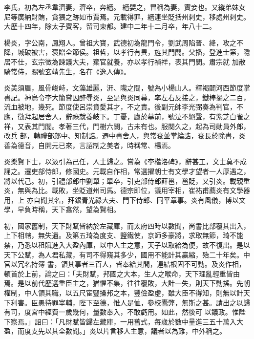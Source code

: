 \begin{pinyinscope}
 李氏，初為左丞韋濟妻，濟卒，奔縉。
 縉嬖之，冒稱為妻，實妾也。又縱弟妹女尼等廣納財賄，貪猥之跡如市賈焉。元載得罪，縉連坐貶括州刺史，移處州刺史。大歷十四年，除太子賓客，留司東都。建中二年十二月卒，年八十二。



 楊炎，字公南，鳳翔人。曾祖大寶，武德初為龍門令，劉武周陷晉、絳，攻之不降，城破被害，褒贈全節侯。祖哲，以孝行有異，旌其門閭。父播，登進士第，隱居不仕，玄宗徵為諫議大夫，棄官就養，亦以孝行禎祥，表其門閭。肅宗就
 加散騎常侍，賜號玄靖先生，名在《逸人傳》。



 炎美須眉，風骨峻峙，文藻雄麗，汧、隴之間，號為小楊山人。釋褐闢河西節度掌書記。神烏令李大簡嘗因醉辱炎，至是與炎同幕，率左右反接之，鐵棒撾之二百，流血被地，幾死。節度使呂崇賁愛其才，不之責。後副元帥李光弼奏為判官，不應，徵拜起居舍人，辭祿就養岐下。丁憂，廬於墓前，號泣不絕聲，有紫芝白雀之祥，又表其門閭。孝著三代，門樹六闕，古未有也。服闋久之，起為司勛員外郎，改兵
 部，轉禮部郎中、知制誥。遷中書舍人，與常袞並掌綸誥，袞長於除書，炎善為德音，自開元已來，言詔制之美者，時稱常、楊焉。



 炎樂賢下士，以汲引為己任，人士歸之。嘗為《李楷洛碑》，辭甚工，文士莫不成誦之。遷吏部侍郎，修國史。元載自作相，常選擢朝士有文學才望者一人厚遇之，將以代己。初，引禮部郎中劉單；單卒，引吏部侍郎薛邕，邕貶，又引炎。載親重炎，無與為比。載敗，坐貶道州司馬。德宗即位，議用宰相，崔祐甫薦炎有文學器用，上
 亦自聞其名，拜銀青光祿大夫、門下侍郎、同平章事。炎有風儀，博以文學，早負時稱，天下翕然，望為賢相。



 初，國家舊制，天下財賦皆納於左藏庫，而太府四時以數聞，尚書比部覆其出入，上下相轄，無失遺。及第五琦為度支、鹽鐵使，京師多豪將，求取無節，琦不能禁，乃悉以租賦進入大盈內庫，以中人主之意，天子以取給為便，故不復出。是以天下公賦，為人君私藏，有司不得窺其多少，國用不能計其贏縮，殆二十年矣。中官以冗名持簿
 書，領其事者三百人，皆奉給其間，連結根固不可動。及炎作相，頓首於上前，論之曰：「夫財賦，邦國之大本，生人之喉命，天下理亂輕重皆由焉。是以前代歷選重臣主之，猶懼不集，往往覆敗，大計一失，則天下動搖。先朝權制，中人領其職，以五尺宦豎操邦之本，豐儉盈虛，雖大臣不得知，則無以計天下利害。臣愚待罪宰輔，陛下至德，惟人是恤，參校蠹弊，無斯之甚。請出之以歸有司，度宮中經費一歲幾何，量數奉入，不敢虧用。如此，然後可
 以議政。惟陛下察焉。」詔曰：「凡財賦皆歸左藏庫，一用舊式，每歲於數中量進三五十萬入大盈，而度支先以其全數聞。」炎以片言移人主意，議者以為難，中外稱之。




\end{pinyinscope}
